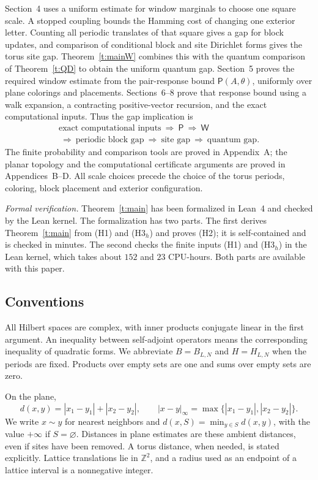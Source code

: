 Section~4 uses a uniform estimate for window marginals to choose one
square scale. A stopped coupling bounds the Hamming cost of changing
one exterior letter. Counting all periodic translates of that square
gives a gap for block updates, and comparison of conditional block
and site Dirichlet forms gives the torus site gap.
Theorem~\ref{t:mainW} combines this with the quantum comparison of
Theorem~\ref{t:QD} to obtain the uniform quantum gap.
Section~5 proves the required window estimate from the pair-response
bound \(\mathsf P(A,\theta)\), uniformly over plane colorings and
placements. Sections~6--8 prove that response bound using a walk
expansion, a contracting positive-vector recursion, and the exact
computational inputs. Thus the gap implication is
\[
 \begin{gathered}
 \text{exact computational inputs}
 \ \Longrightarrow\ \mathsf P
 \ \Longrightarrow\ \mathsf W\\
 \ \Longrightarrow\ \text{periodic block gap}
 \ \Longrightarrow\ \text{site gap}
 \ \Longrightarrow\ \text{quantum gap}.
 \end{gathered}
\]
The finite probability and comparison tools are proved in Appendix~A;
the planar topology and the computational certificate arguments are
proved in Appendices~B--D. All scale choices precede the choice of the
torus periods, coloring, block placement and exterior configuration.

\emph{Formal verification.}
Theorem~\ref{t:main} has been formalized in Lean~4 and checked by the
Lean kernel. The formalization has two parts. The first derives
Theorem~\ref{t:main} from (H1) and (H3\(_h\)) and proves (H2); it is
self-contained and is checked in minutes. The second checks the
finite inputs (H1) and (H3\(_h\)) in the Lean kernel, which takes
about \(152\) and \(23\) CPU-hours. Both parts are available with
this paper. %

\subsection{Conventions}

All Hilbert spaces are complex, with inner products conjugate linear
in the first argument. An inequality between self-adjoint operators
means the corresponding inequality of quadratic forms.
We abbreviate \(B=B_{L,N}\) and \(H=H_{L,N}\) when the periods are
fixed. Products over empty sets are one and sums over empty sets
are zero.

On the plane,
\[
 d(x,y)=|x_1-y_1|+|x_2-y_2|,\qquad
 |x-y|_\infty=\max\{|x_1-y_1|,|x_2-y_2|\}.
\]
We write \(x\sim y\) for nearest neighbors and
\(d(x,S)=\min_{y\in S}d(x,y)\), with the value \(+\infty\) if
\(S=\varnothing\). Distances in plane estimates are these ambient
distances, even if sites have been removed. A torus distance, when
needed, is stated explicitly.
Lattice translations lie in \(\mathbb Z^2\), and a radius used as
an endpoint of a lattice interval is a nonnegative integer.

